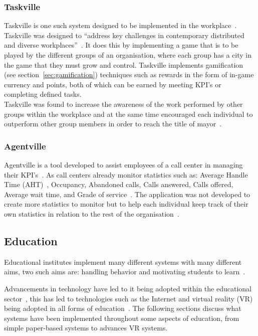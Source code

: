 \documentclass[a4paper,12pt]{article}
\begin{document}
\subsubsection{Taskville}\label{sec:taskville}
Taskville is one such system designed to be implemented in the workplace~\citep{taskville}. Taskville was designed to ``address key challenges in contemporary distributed and diverse workplaces''~\citep[p.~4]{taskville}. 
It does this by implementing a game that is to be played by the different groups of an organisation, where each group  has a city in the game that they must grow and control. Taskville implements gamification (see section~\ref{sec:gamification}) techniques such as rewards in the form of in-game currency and points, both of which can be earned by meeting KPI's or completing defined tasks.\\ 
Taskville was found to increase the awareness of the work performed by other groups within the workplace and at the same time encouraged each individual to outperform other group members in order to reach the title of mayor~\citep{taskville}.

\subsubsection{Agentville}\label{sec:agentville}
Agentville is a tool developed to assist employees of a call center in managing their KPI's~\citep{production-environments}. 
As call centers already monitor statistics such as: Average Handle Time (AHT)~\citep{production-environments},	Occupancy, Abandoned calls,	Calls answered,	Calls offered, Average wait time, and Grade of service~\citep{call-center}. 
The application was not developed to create more statistics to monitor but to help each individual keep track of their own statistics in relation to the rest of the organisation~\citep{production-environments}.

\subsection{Education}\label{sec:education}
Educational institutes implement many different systems with many different aims, two such aims are: handling behavior and motivating students to learn~\citep{deci_extrinsic_2001}.

\par
Advancements in technology have led to it being adopted within the educational sector~\citep{distance-education}, this has led to technologies such as the Internet and virtual reality (VR) being adopted in all forms of education~\citep{virtual-reality}.
The following sections discuss what systems have been implemented throughout some aspects of education, from simple paper-based systems to advances VR systems.
\end{document}
